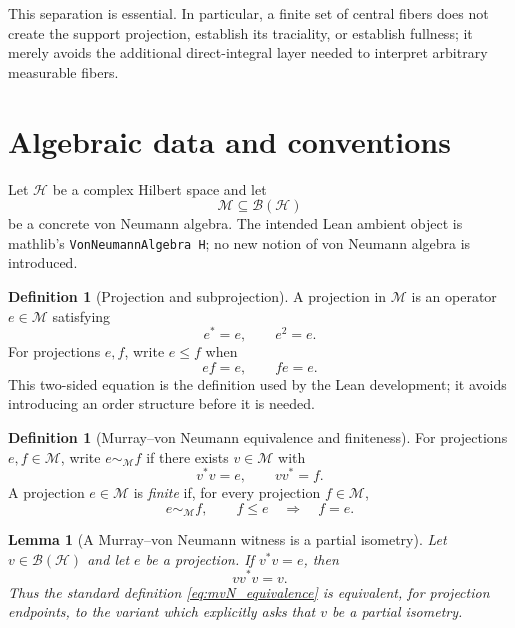 \documentclass[11pt,reqno]{amsart}
\numberwithin{equation}{section}
\newtheorem{lemma}[theorem]{Lemma}
\theoremstyle{definition}
\newtheorem{definition}[theorem]{Definition}
\theoremstyle{remark}
\newcommand{\cB}{\mathcal B}
\newcommand{\cH}{\mathcal H}
\newcommand{\cM}{\mathcal M}
\begin{document}
This separation is essential.  In particular, a finite set of central fibers
does not create the support projection, establish its traciality, or establish
fullness; it merely avoids the additional direct-integral layer needed to
interpret arbitrary measurable fibers.

\section{Algebraic data and conventions}
\label{sec:algebraic_data}

Let $\cH$ be a complex Hilbert space and let
\begin{equation}
  \cM\subseteq\cB(\cH)
  \label{eq:concrete_von_neumann_algebra}
\end{equation}
be a concrete von Neumann algebra.  The intended Lean ambient object is
mathlib's \texttt{VonNeumannAlgebra H}; no new notion of von Neumann algebra
is introduced.

\begin{definition}[Projection and subprojection]
\label{def:projection_subprojection}
A projection in $\cM$ is an operator $e\in\cM$ satisfying
\begin{equation}
  e^*=e,
  \qquad
  e^2=e.
  \label{eq:star_projection}
\end{equation}
For projections $e,f$, write $e\leq f$ when
\begin{equation}
  ef=e,
  \qquad
  fe=e.
  \label{eq:subprojection}
\end{equation}
This two-sided equation is the definition used by the Lean development; it
avoids introducing an order structure before it is needed.
\end{definition}

\begin{definition}[Murray--von Neumann equivalence and finiteness]
\label{def:mvN_finiteness}
For projections $e,f\in\cM$, write $e\sim_{\cM}f$ if there exists
$v\in\cM$ with
\begin{equation}
  v^*v=e,
  \qquad
  vv^*=f.
  \label{eq:mvN_equivalence}
\end{equation}
A projection $e\in\cM$ is \emph{finite} if, for every projection
$f\in\cM$,
\begin{equation}
  e\sim_{\cM}f,
  \qquad
  f\leq e
  \quad\Longrightarrow\quad
  f=e.
  \label{eq:finite_projection}
\end{equation}
\end{definition}

\begin{lemma}[A Murray--von Neumann witness is a partial isometry]
\label{lem:mvN_witness_partial_isometry}
Let $v\in\cB(\cH)$ and let $e$ be a projection.  If $v^*v=e$, then
\begin{equation}
  vv^*v=v.
  \label{eq:mvN_witness_partial_isometry}
\end{equation}
Thus the standard definition \eqref{eq:mvN_equivalence} is equivalent, for
projection endpoints, to the variant which explicitly asks that $v$ be a
partial isometry.
\end{lemma}
\end{document}
